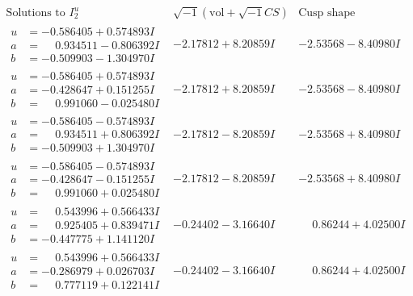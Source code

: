 \documentclass[1p]{elsarticle_modified}
\theoremstyle{definition}
\newcommand{\I}{\sqrt{-1}}
\begin{document}
$$\begin{array}{c|c|c}  
\text{Solutions to }I^u_{2}& \I (\text{vol} + \sqrt{-1}CS) & \text{Cusp shape}\\
 \hline 
\begin{aligned}
u &= -0.586405 + 0.574893 I \\
a &= \phantom{-}0.934511 - 0.806392 I \\
b &= -0.509903 - 1.304970 I\end{aligned}
 & -2.17812 + 8.20859 I & -2.53568 - 8.40980 I \\ \hline\begin{aligned}
u &= -0.586405 + 0.574893 I \\
a &= -0.428647 + 0.151255 I \\
b &= \phantom{-}0.991060 - 0.025480 I\end{aligned}
 & -2.17812 + 8.20859 I & -2.53568 - 8.40980 I \\ \hline\begin{aligned}
u &= -0.586405 - 0.574893 I \\
a &= \phantom{-}0.934511 + 0.806392 I \\
b &= -0.509903 + 1.304970 I\end{aligned}
 & -2.17812 - 8.20859 I & -2.53568 + 8.40980 I \\ \hline\begin{aligned}
u &= -0.586405 - 0.574893 I \\
a &= -0.428647 - 0.151255 I \\
b &= \phantom{-}0.991060 + 0.025480 I\end{aligned}
 & -2.17812 - 8.20859 I & -2.53568 + 8.40980 I \\ \hline\begin{aligned}
u &= \phantom{-}0.543996 + 0.566433 I \\
a &= \phantom{-}0.925405 + 0.839471 I \\
b &= -0.447775 + 1.141120 I\end{aligned}
 & -0.24402 - 3.16640 I & \phantom{-}0.86244 + 4.02500 I \\ \hline\begin{aligned}
u &= \phantom{-}0.543996 + 0.566433 I \\
a &= -0.286979 + 0.026703 I \\
b &= \phantom{-}0.777119 + 0.122141 I\end{aligned}
 & -0.24402 - 3.16640 I & \phantom{-}0.86244 + 4.02500 I \\ \hline\begin{aligned}

\end{aligned}
\end{array}$$
\end{document}
